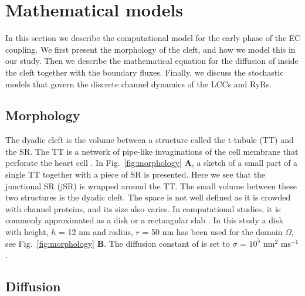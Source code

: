 \section{Mathematical models}
\label{sec:mathematical-models}
In this section we describe the computational model for the early phase of the EC coupling. We first present the morphology of the cleft, and how we model this in our study. Then we describe the mathematical equation for the diffusion of \Ca inside the cleft together with the boundary fluxes. Finally, we discuss the stochastic models that govern the discrete channel dynamics of the LCCs and RyRs.\par

\subsection*{Morphology}
\label{sec:morphology}
The dyadic cleft is the volume between a structure called the t-tubule (TT) and the SR. The TT is a network of pipe-like invaginations of the cell membrane that perforate the heart cell \cite{SoellerCannell1999}. In Fig.~\ref{fig:morphology} \textbf{A}, a sketch of a small part of a single TT together with a piece of SR is presented. Here we see that the junctional SR (jSR) is wrapped around the TT. The small volume between these two structures is the dyadic cleft. The space is not well defined as it is crowded with channel proteins, and its size also varies. In computational studies, it is commonly approximated as a disk or a rectangular slab \cite{PeskoffPostLanger1992,SoellerCannell1997,KohSrinivasanEtAl2006,TanskanenGreensteinEtAl2007}. In this study a disk with height, $h$ = 12 nm and radius, $r$ = 50 nm has been used for the domain $\Omega$, see Fig.~\ref{fig:morphology} \textbf{B}. The diffusion constant of \Ca is set to $\sigma$ = $10^5$ nm$^2$ ms$^{-1}$ \cite{LangerPeskoff1996}.\par

\subsection*{\Ca Diffusion}
\label{sec:ca-diffusion}

